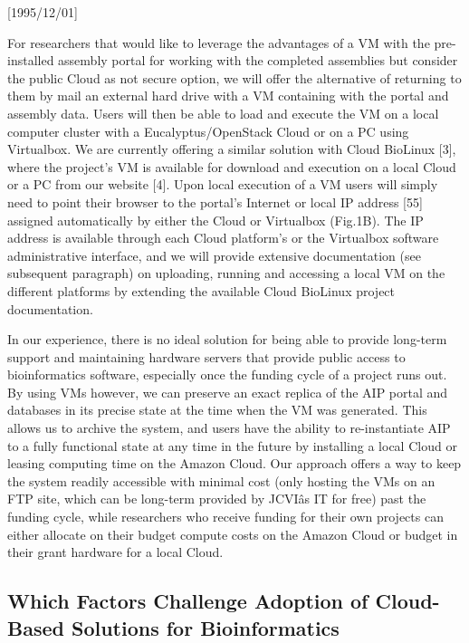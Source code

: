 \NeedsTeXFormat{LaTeX2e}[1995/12/01] \documentclass[10pt]{bmc_article}
\newenvironment{bmcformat}{\begin{raggedright}\baselineskip20pt\sloppy\setboolean{publ}{false}}{\end{raggedright}\baselineskip20pt\sloppy}
\begin{document}
\begin{bmcformat}
 For researchers that would like to leverage the advantages of a VM with the pre-installed assembly portal for
 working with the completed assemblies but consider the public Cloud as not secure option, we will offer the
 alternative of returning to them by mail an external hard drive with a VM containing with the portal and
 assembly data. Users will then be able to load and execute the VM on a local computer cluster with a
 Eucalyptus/OpenStack Cloud or on a PC using Virtualbox. We are currently offering a similar solution with
 Cloud BioLinux [3], where the project's VM is available for download and execution on a local Cloud or a PC
 from our website [4].  Upon local execution of a VM users will simply need to point their browser to the
 portal's Internet or local IP address [55] assigned automatically by either the Cloud or Virtualbox (Fig.1B).
 The IP address is available through each Cloud platform's or the Virtualbox software administrative
 interface, and we will provide extensive documentation (see subsequent paragraph) on uploading, running and
 accessing a local VM on the different platforms by extending the available Cloud BioLinux project
 documentation.

In our experience, there is no ideal solution for being able to provide long-term support and maintaining
hardware servers that provide public access to bioinformatics software, especially once the funding cycle of a
project runs out.  By using VMs however, we can preserve an exact replica of the AIP portal and databases in
its precise state at the time when the VM was generated. This allows us to archive the system, and users have
the ability to re-instantiate AIP to a fully functional state at any time in the future by installing a local
Cloud or leasing computing time on the Amazon Cloud. Our approach offers a way to keep the system readily
accessible with minimal cost (only hosting the VMs on an FTP site, which can be long-term provided by JCVIâs
IT for free) past the funding cycle, while researchers who receive funding for their own projects can either
allocate on their budget compute costs on the Amazon Cloud or budget in their grant hardware for a local
Cloud.

\subsection*{Which Factors Challenge Adoption of Cloud-Based Solutions for Bioinformatics }


\end{bmcformat}
\end{document}
